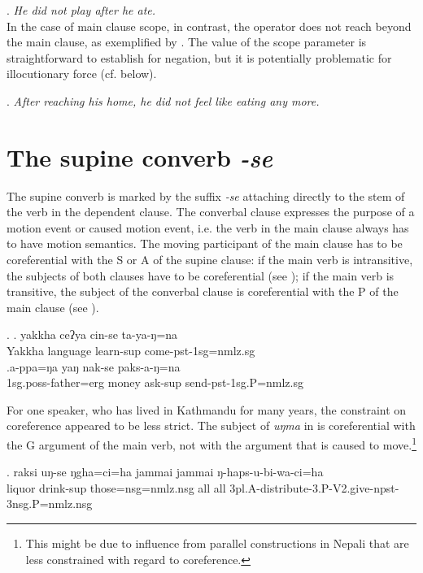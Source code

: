 \ex. \emph{He did not play after he ate.}\\

In the case of main clause scope, in contrast, the operator does not reach beyond the main clause, as exemplified by \Next. The value of the scope parameter is straightforward to establish for negation, but it is potentially problematic for illocutionary force (cf. below).

\ex. \emph{After reaching his home, he did not feel like eating any more.}

\section{The supine converb \emph{-se}}\label{sup}

The supine converb is marked by the suffix \emph{-se} attaching directly to the stem of the verb in the dependent clause.  The converbal clause expresses the purpose of a motion event or caused motion event, i.e. the verb in the main clause always has to have motion semantics. The moving participant of the main clause has to be coreferential with the S or A of the supine clause: if the main verb is intransitive, the subjects of both clauses have to be coreferential (see \Next[a]); if the main verb is transitive, the subject of the converbal clause is coreferential with the P of the main clause (see \Next[b]). 
		
\ex. \ag.	yakkha ceʔya cin-se ta-ya-ŋ=na\\
			Yakkha language learn{\sc -sup} come-{\sc pst-1sg=nmlz.sg}\\
	\bg.\label{se-appa}a-ppa=ŋa  yaŋ  nak-se  paks-a-ŋ=na\\
		{\sc 1sg.poss-}father{\sc =erg} money ask{\sc -sup}  send-{\sc pst-1sg.P=nmlz.sg}\\
		
For one speaker, who has lived  in Kathmandu for many years, the constraint on coreference appeared to be less strict. The subject of \emph{uŋma}  in \Next is coreferential with the G argument of the main verb, not with the argument that is caused to move.\footnote{This might be due to influence from parallel constructions in Nepali that are less constrained with regard to coreference.}

		\exg.		raksi  uŋ-se          ŋgha=ci=ha            jammai jammai ŋ-haps-u-bi-wa-ci=ha\\
	liquor   drink{\sc -sup} those{\sc =nsg=nmlz.nsg} all all {\sc 3pl.A-}distribute{\sc -3.P-V2.give-npst-3nsg.P=nmlz.nsg}\\
		
